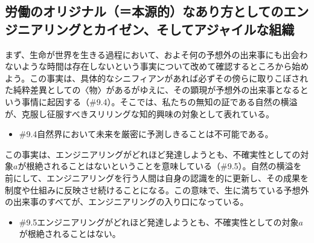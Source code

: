 \subsection{労働のオリジナル（＝本源的）なあり方としてのエンジニアリングとカイゼン、そしてアジャイルな組織}\label{ux52b4ux50cdux306eux30aaux30eaux30b8ux30caux30ebux672cux6e90ux7684ux306aux3042ux308aux65b9ux3068ux3057ux3066ux306eux30a8ux30f3ux30b8ux30cbux30a2ux30eaux30f3ux30b0ux3068ux30abux30a4ux30bcux30f3ux305dux3057ux3066ux30a2ux30b8ux30e3ux30a4ux30ebux306aux7d44ux7e54}

まず、生命が世界を生きる過程において、およそ何の予想外の出来事にも出会わないような時間は存在しないという事実について改めて確認するところから始めよう。この事実は、具体的なシニフィアンがあれば必ずその傍らに取りこぼされた純粋差異としての〈物〉があるがゆえに、その顕現が予想外の出来事となるという事情に起因する（\#9.4）。そこでは、私たちの無知の証である自然の横溢が、克服し征服すべきスリリングな知的興味の対象として表れている。

\begin{note}{}
  \begin{itemize}
    \tightlist
    \item{\#9.4}自然界において未来を厳密に予測しきることは不可能である。
  \end{itemize}
\end{note}

この事実は、エンジニアリングがどれほど発達しようとも、不確実性としての対象\(a\)が根絶されることはないということを意味している（\#9.5）。自然の横溢を前にして、エンジニアリングを行う人間は自身の認識を的に更新し、その成果を制度や仕組みに反映させ続けることになる。この意味で、生に満ちている予想外の出来事のすべてが、エンジニアリングの入り口になっている。

\begin{note}{}
  \begin{itemize}
    \tightlist
    \item{\#9.5}エンジニアリングがどれほど発達しようとも、不確実性としての対象$a$が根絶されることはない。
  \end{itemize}
\end{note}

